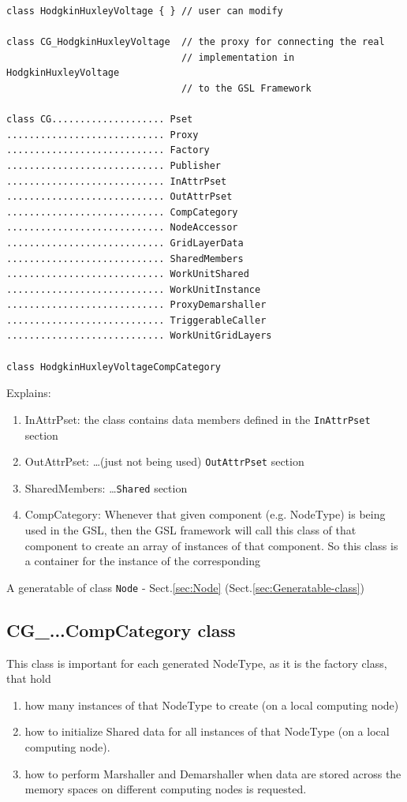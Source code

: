\begin{lstlisting}
class HodgkinHuxleyVoltage { } // user can modify

class CG_HodgkinHuxleyVoltage  // the proxy for connecting the real
                               // implementation in HodgkinHuxleyVoltage
                               // to the GSL Framework 

class CG.................... Pset
............................ Proxy
............................ Factory
............................ Publisher
............................ InAttrPset
............................ OutAttrPset
............................ CompCategory
............................ NodeAccessor
............................ GridLayerData
............................ SharedMembers
............................ WorkUnitShared
............................ WorkUnitInstance
............................ ProxyDemarshaller
............................ TriggerableCaller
............................ WorkUnitGridLayers

class HodgkinHuxleyVoltageCompCategory
\end{lstlisting}

Explains:
\begin{enumerate}
  \item InAttrPset: the class contains data members defined in the
  \verb!InAttrPset! section
  
  \item OutAttrPset: \ldots (just not being used) \verb!OutAttrPset! section
  
  \item SharedMembers: \ldots \verb!Shared! section
  
  \item CompCategory: Whenever that given component (e.g. NodeType) is being
  used in the GSL, then the GSL framework will call this class of that component
  to create an array of instances of that component. So this class is a
  container for the instance of the corresponding 
\end{enumerate}

A generatable of class \verb!Node! - Sect.\ref{sec:Node} (Sect.\ref{sec:Generatable-class}) 


\subsection{CG\_...CompCategory class}

This class is important for each generated NodeType, as it 
is the factory class, that hold 
\begin{enumerate}
  \item  how many instances of that NodeType to create (on a local computing
  node)

  \item how to initialize Shared data for all instances of that NodeType (on a
  local computing node).
  
  \item how to perform Marshaller and Demarshaller when data are stored across
  the memory spaces on different computing nodes is requested.
\end{enumerate}

